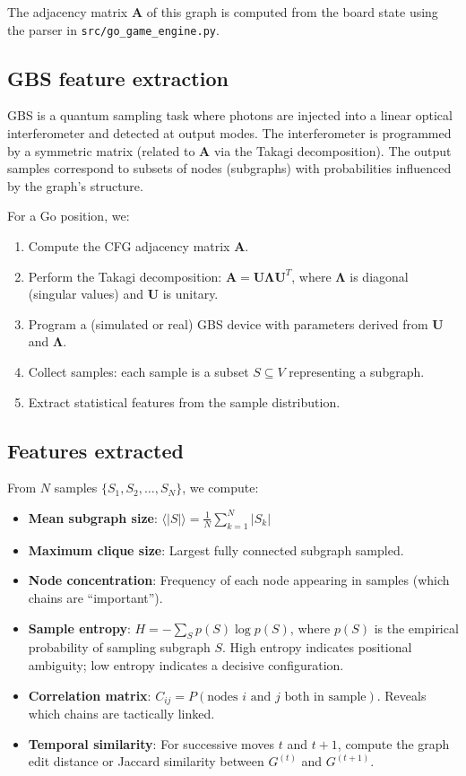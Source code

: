 \documentclass[aps,prl,reprint]{revtex4-2}
\begin{document}
The adjacency matrix $\mathbf{A}$ of this graph is computed from the board state using the parser in \texttt{src/go\_game\_engine.py}.

\subsection{GBS feature extraction}

GBS is a quantum sampling task where photons are injected into a linear optical interferometer and detected at output modes. The interferometer is programmed by a symmetric matrix (related to $\mathbf{A}$ via the Takagi decomposition). The output samples correspond to subsets of nodes (subgraphs) with probabilities influenced by the graph's structure.

For a Go position, we:
\begin{enumerate}
	\item Compute the CFG adjacency matrix $\mathbf{A}$.
	\item Perform the Takagi decomposition: $\mathbf{A} = \mathbf{U} \mathbf{\Lambda} \mathbf{U}^T$, where $\mathbf{\Lambda}$ is diagonal (singular values) and $\mathbf{U}$ is unitary.
	\item Program a (simulated or real) GBS device with parameters derived from $\mathbf{U}$ and $\mathbf{\Lambda}$.
	\item Collect samples: each sample is a subset $S \subseteq V$ representing a subgraph.
	\item Extract statistical features from the sample distribution.
\end{enumerate}

\subsection{Features extracted}

From $N$ samples $\{S_1, S_2, \ldots, S_N\}$, we compute:

\begin{itemize}
	\item \textbf{Mean subgraph size}: $\langle |S| \rangle = \frac{1}{N}\sum_{k=1}^N |S_k|$
	\item \textbf{Maximum clique size}: Largest fully connected subgraph sampled.
	\item \textbf{Node concentration}: Frequency of each node appearing in samples (which chains are ``important'').
	\item \textbf{Sample entropy}: $H = -\sum_{S} p(S) \log p(S)$, where $p(S)$ is the empirical probability of sampling subgraph $S$. High entropy indicates positional ambiguity; low entropy indicates a decisive configuration.
	\item \textbf{Correlation matrix}: $C_{ij} = P(\text{nodes } i \text{ and } j \text{ both in sample})$. Reveals which chains are tactically linked.
	\item \textbf{Temporal similarity}: For successive moves $t$ and $t+1$, compute the graph edit distance or Jaccard similarity between $G^{(t)}$ and $G^{(t+1)}$.
\end{itemize}
\end{document}
